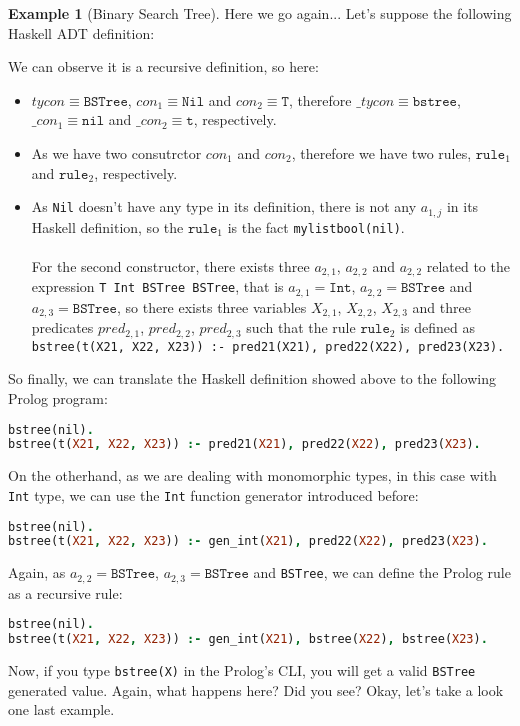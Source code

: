 \documentclass{report}
\theoremstyle{definition}
\newtheorem{example}{Example}[section]
\theoremstyle{definition}
\newcommand{\ttt}[1]{\texttt{#1}}
\begin{document}
\begin{example}[Binary Search Tree]
	Here we go again... Let's suppose the following Haskell ADT definition:
	
	We can observe it is a recursive definition, so here:
	\begin{itemize}
		\item $tycon \equiv \ttt{BSTree}$, $con_1 \equiv \ttt{Nil}$ and $con_2 \equiv \ttt{T}$, therefore $\_tycon \equiv \ttt{bstree}$, $\_con_1 \equiv \ttt{nil}$ and $\_con_2 \equiv \ttt{t}$, respectively.
		\item As we have two consutrctor $con_1$ and $con_2$, therefore we have two rules, $\ttt{rule}_1$ and $\ttt{rule}_2$, respectively.
		\item As \ttt{Nil} doesn't have any type in its definition, there is not any $a_{1,j}$ in its Haskell definition, so the $\ttt{rule}_1$ is the fact \ttt{mylistbool(nil)}.\\\\
		For the second constructor, there exists three $a_{2,1}$, $a_{2,2}$ and $a_{2,2}$ related to the expression \ttt{T Int BSTree BSTree}, that is $a_{2,1} = \ttt{Int}$, $a_{2,2} = \ttt{BSTree}$ and $a_{2,3} = \ttt{BSTree}$, so there exists three variables $X_{2,1}$, $X_{2,2}$, $X_{2,3}$ and three predicates $pred_{2,1}$, $pred_{2,2}$, $pred_{2,3}$ such that the rule $\ttt{rule}_2$ is defined as \\ \ttt{bstree(t(X21, X22, X23)) :- pred21(X21), pred22(X22), pred23(X23).}
	\end{itemize}
	So finally, we can translate the Haskell definition showed above to the following Prolog program:\\
\begin{lstlisting}[language=Prolog]
bstree(nil).																														%% rule 1
bstree(t(X21, X22, X23)) :- pred21(X21), pred22(X22), pred23(X23).			%% rule 2
\end{lstlisting}
On the otherhand, as we are dealing with monomorphic types, in this case with \ttt{Int} type, we can use the \ttt{Int} function generator introduced before:\\
\begin{lstlisting}[language=Prolog]
bstree(nil).																														%% rule 1
bstree(t(X21, X22, X23)) :- gen_int(X21), pred22(X22), pred23(X23).			%% rule 2
\end{lstlisting}
Again, as $a_{2,2} = \ttt{BSTree}$, $a_{2,3} = \ttt{BSTree}$ and \ttt{BSTree}, we can define the Prolog rule as a recursive rule:\\
\begin{lstlisting}[language=Prolog]
bstree(nil).																														%% rule 1
bstree(t(X21, X22, X23)) :- gen_int(X21), bstree(X22), bstree(X23).			%% rule 2
\end{lstlisting}
Now, if you type \ttt{bstree(X)} in the Prolog's CLI, you will get a valid \ttt{BSTree} generated value. Again, what happens here? Did you see? Okay, let's take a look one last example.
\end{example}
\end{document}
